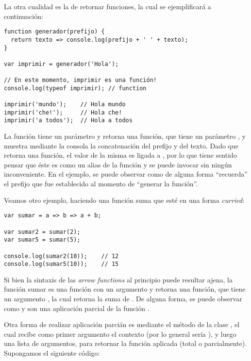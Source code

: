 La otra cualidad es la de retornar funciones, la cual se ejemplificará a continuación:

\begin{lstlisting}[title={Retornando funciones}]
function generador(prefijo) {
  return texto => console.log(prefijo + ' ' + texto);
}

var imprimir = generador('Hola');

// En este momento, imprimir es una función!
console.log(typeof imprimir); // function

imprimir('mundo');    // Hola mundo
imprimir('che!');     // Hola che!
imprimir('a todos');  // Hola a todos
\end{lstlisting}

La función  tiene un parámetro  y retorna una función, que tiene un parámetro , y muestra mediante la consola la concatenación del prefijo y del texto. Dado que  retorna una función, el valor de la misma es ligada a , por lo que tiene sentido pensar que éste es como un alias de la función y se puede invocar sin ningún inconveniente. En el ejemplo, se puede observar como  de alguna forma "`recuerda"' el prefijo que fue establecido al momento de "`generar la función"'.

Veamos otro ejemplo, haciendo una función suma que esté en una forma \textit{curried}:

\begin{lstlisting}[title={Función suma \textit{curried}}]
var sumar = a => b => a + b;

var sumar2 = sumar(2);
var sumar5 = sumar(5);

console.log(sumar2(10));	// 12
console.log(sumar5(10));	// 15
\end{lstlisting}

Si bien la sintaxis de las \textit{arrow functions} al principio puede resultar ajena, la función sumar es una función con un argumento  y retorna una función, que tiene un argumento , la cual retorna la suma de . De alguna forma, se puede observar como  y  son una aplicación parcial de la función .

Otra forma de realizar aplicación parcián es mediante el método  de la clase , el cual recibe como primer argumento el contexto (por lo general sería ), y luego una lista de argumentos, para retornar la función aplicada (total o parcialmente). Supongamos el siguiente código:

